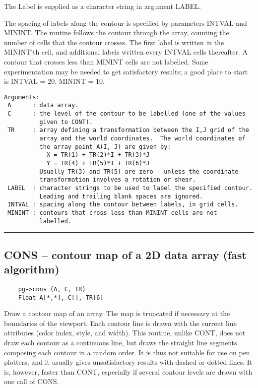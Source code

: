 The Label is supplied as a character string in argument LABEL.

The spacing of labels along the contour is specified by parameters
INTVAL and MININT.  The routine follows the contour through the array,
counting the number of cells that the contour crosses.  The first
label is written in the MININT'th cell, and additional labels
written every INTVAL cells thereafter.  A contour that crosses
less than MININT cells are not labelled.  Some experimentation may
be needed to get satisfactory results; a good place to start is
INTVAL = 20, MININT = 10.

\begin{verbatim}
Arguments:
 A      : data array.
 C      : the level of the contour to be labelled (one of the values
          given to CONT). 
 TR     : array defining a transformation between the I,J grid of the
          array and the world coordinates.  The world coordinates of
          the array point A(I, J) are given by:
            X = TR(1) + TR(2)*I + TR(3)*J
            Y = TR(4) + TR(5)*I + TR(6)*J
          Usually TR(3) and TR(5) are zero - unless the coordinate
          transformation involves a rotation or shear.
 LABEL  : character strings to be used to label the specified contour.
          Leading and trailing blank spaces are ignored.
 INTVAL : spacing along the contour between labels, in grid cells. 
 MININT : contours that cross less than MININT cells are not
          labelled. 
\end{verbatim}

\hrule

\subsection*{CONS -- contour map of a 2D data array (fast algorithm) }

\begin{verbatim}
    pg->cons (A, C, TR)
    Float A[*,*], C[], TR[6]
\end{verbatim}

Draw a contour map of an array.  The map is truncated if necessary at
the boundaries of the viewport.  Each contour line is drawn with the
current line attributes (color index, style, and width).  This
routine, unlike CONT, does not draw each contour as a continuous line,
but draws the straight line segments composing each contour in a
random order.  It is thus not suitable for use on pen plotters, and it
usually gives unsatisfactory results with dashed or dotted lines.  It
is, however, faster than CONT, especially if several contour levels
are drawn with one call of CONS.

